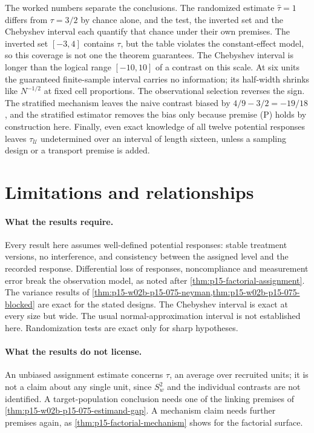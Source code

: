 The worked numbers separate the conclusions. The randomized estimate
\(\widehat\tau=1\) differs from \(\tau=3/2\) by chance alone, and the test,
the inverted set and the Chebyshev interval each quantify that chance under
their own premises. The inverted set \([-3,4]\) contains \(\tau\), but the
table violates the constant-effect model, so this coverage is not one the
theorem guarantees. The Chebyshev interval is longer than the logical range
\([-10,10]\) of a contrast on this scale. At six units the guaranteed
finite-sample interval carries no information; its half-width shrinks like
\(N^{-1/2}\) at fixed cell proportions. The observational selection reverses
the sign. The stratified mechanism leaves the naive contrast biased by
\(4/9-3/2=-19/18\), and the stratified estimator removes the bias only because
premise (P) holds by construction here. Finally, even exact knowledge of all
twelve potential responses leaves \(\tau_{\mathcal U}\) undetermined over an
interval of length sixteen, unless a sampling design or a transport premise is
added.

\section{Limitations and relationships}
\label{sec:p15-w02b-p15-075-relationships}

\paragraph{What the results require.}
Every result here assumes well-defined potential responses: stable treatment
versions, no interference, and consistency between the assigned level and the
recorded response. Differential loss of responses, noncompliance and
measurement error break the observation model, as noted after
\cref{thm:p15-factorial-assignment}. The variance results of
\cref{thm:p15-w02b-p15-075-neyman,thm:p15-w02b-p15-075-blocked} are exact
for the stated designs. The Chebyshev interval is exact at every size but wide.
The usual normal-approximation interval is not established here. Randomization
tests are exact only for sharp hypotheses.

\paragraph{What the results do not license.}
An unbiased assignment estimate concerns \(\tau\), an average over recruited
units; it is not a claim about any single unit, since \(S_w^2\) and the
individual contrasts are not identified. A target-population conclusion needs
one of the linking premises of \cref{thm:p15-w02b-p15-075-estimand-gap}. A
mechanism claim needs further premises again, as
\cref{thm:p15-factorial-mechanism} shows for the factorial surface.

